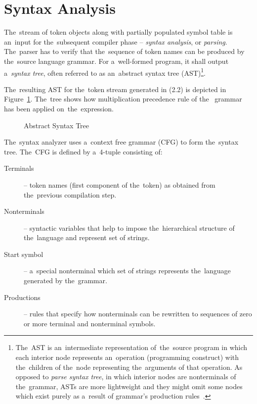 \documentclass[
  digital, %
  table,   %
  lof,     %
  lot,     %
  oneside,
]{fithesis3}
\begin{document}
  \section{Syntax Analysis}
The~stream of token objects along with partially populated symbol table is an~input for the~subsequent compiler phase -- \textit{syntax analysis}, or \textit{parsing}. The~parser has to verify that the~sequence of token names can be produced by the~source language grammar. For a~well-formed program, it shall output a~\textit{syntax tree}, often referred to as an~abstract syntax tree (AST)\footnote{The~AST is an~intermediate representation of~the~source program in which each interior node represents an~operation (programming construct) with the~children of the~node representing the~arguments of that operation. As opposed to \textit{parse syntax tree}, in which interior nodes are nonterminals of the~grammar, ASTs are more lightweight and they might omit some nodes which exist purely as a~result of grammar's production rules~\cite{secure-programming-with-sca}.}.

The~resulting AST for the~token stream generated in (2.2) is depicted in Figure~\ref{fig:compilers-abstract-syntax-tree}. The~tree shows how multiplication precedence rule of the~ grammar has been applied on~the~expression.

\begin{figure}
  \centering
  \caption{Abstract Syntax Tree}
  \label{fig:compilers-abstract-syntax-tree}
\end{figure}

The~syntax analyzer uses a~context free grammar (CFG) to form the~syntax tree. The~CFG is defined by a~4-tuple consisting of:
\begin{description}
  \item[Terminals] -- token names (first component of the~token) as obtained from the~previous compilation step.
  \item[Nonterminals] -- syntactic variables that help to impose the~hierarchical structure of the~language and represent set of strings.
  \item[Start symbol] -- a~special nonterminal which set of strings represents the~language generated by the~grammar.
  \item[Productions] -- rules that specify how nonterminals can be rewritten to sequences of zero or more terminal and nonterminal symbols. 
\end{description}
\end{document}
